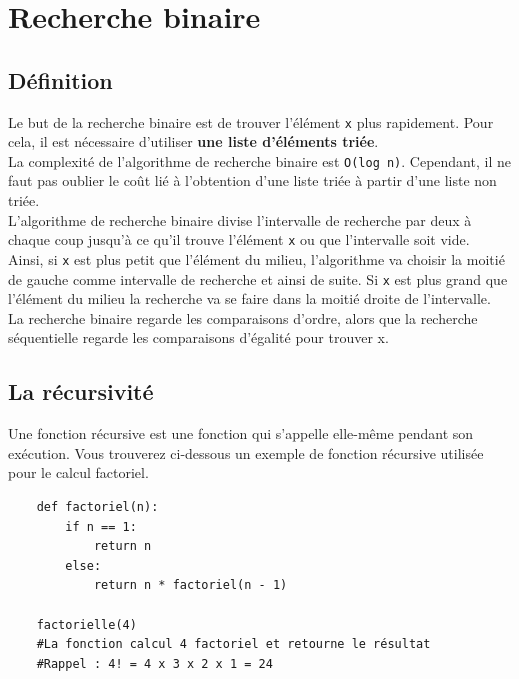 \newpage
\section{Recherche binaire}

\subsection{Définition}

Le but de la recherche binaire est de trouver l'élément \lstinline{x} plus rapidement. Pour cela, il est nécessaire d'utiliser \textbf{une liste d'éléments triée}.\\

La complexité de l'algorithme de recherche binaire est \lstinline{O(log n)}. Cependant, il ne faut pas oublier le coût lié à l'obtention d'une liste triée à partir d'une liste non triée.\\

L'algorithme de recherche binaire divise l'intervalle de recherche par deux à chaque coup jusqu'à ce qu'il trouve l'élément \lstinline{x} ou que l'intervalle soit vide.\\

Ainsi, si \lstinline{x} est plus petit que l'élément du milieu, l'algorithme va choisir la moitié de gauche comme intervalle de recherche et ainsi de suite. Si \lstinline{x} est plus grand que l'élément du milieu la recherche va se faire dans la moitié droite de l'intervalle.\\

La recherche binaire regarde les comparaisons d'ordre, alors que la recherche séquentielle regarde les comparaisons d'égalité pour trouver x.\\

\subsection{La récursivité}

Une fonction récursive est une fonction qui s'appelle elle-même pendant son exécution. Vous trouverez ci-dessous un exemple de fonction récursive utilisée pour le calcul factoriel.

\begin{verbatim}
    def factoriel(n):
        if n == 1:
            return n
        else:
            return n * factoriel(n - 1)
            
    factorielle(4)
    #La fonction calcul 4 factoriel et retourne le résultat 
    #Rappel : 4! = 4 x 3 x 2 x 1 = 24
\end{verbatim}

